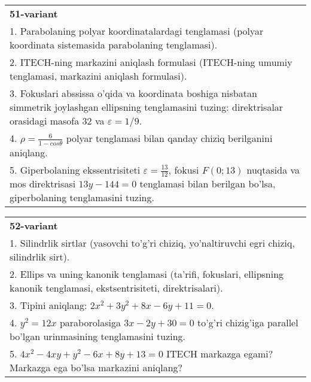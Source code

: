 \documentclass{article}
\begin{document}
\begin{tabular}{m{17cm}}
\textbf{51-variant}\\
1. Parabolaning polyar koordinatalardagi tenglamasi (polyar koordinata sistemasida parabolaning tenglamasi).\\

2. ITECH-ning markazini aniqlash formulasi (ITECH-ning umumiy tenglamasi, markazini aniqlash formulasi).\\

3. Fokuslari abssissa o'qida va koordinata boshiga nisbatan simmetrik joylashgan ellipsning tenglamasini tuzing: direktrisalar orasidagi masofa $32$ va $\varepsilon=1/9$.\\

4. $\rho = \frac{6}{1 - cos\theta}$ polyar tenglamasi bilan qanday chiziq berilganini aniqlang.  \\

5. Giperbolaning ekssentrisiteti $\varepsilon = \frac{13}{12}$, fokusi $F(0;13)$ nuqtasida va mos direktrisasi $13y - 144 = 0$ tenglamasi bilan berilgan bo'lsa, giperbolaning tenglamasini tuzing.  
\end{tabular}
\vspace{1cm}


\begin{tabular}{m{17cm}}
\textbf{52-variant}\\
1. Silindrlik sirtlar (yasovchi to'g'ri chiziq, yo'naltiruvchi egri chiziq, silindrlik sirt).\\

2. Ellips va uning kanonik tenglamasi (ta'rifi, fokuslari, ellipsning kanonik tenglamasi, ekstsentrisiteti, direktrisalari).\\

3. Tipini aniqlang: $2x^{2}+3y^{2}+8x-6y+11=0$.\\

4. $y^{2} = 12x$ paraborolasiga $3x - 2y + 30 = 0$ to'g'ri chizig'iga parallel bo'lgan urinmasining tenglamasini tuzing.  \\

5. $4x^{2} - 4xy + y^{2} - 6x + 8y + 13 = 0$ ITECH markazga egami? Markazga ega bo'lsa markazini aniqlang?  
\end{tabular}
\vspace{1cm}
\end{document}
